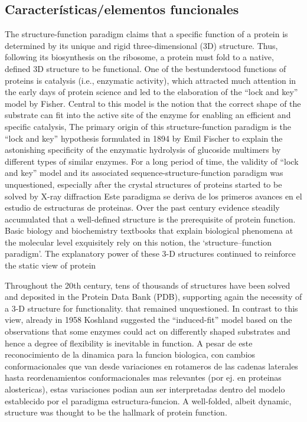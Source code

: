 \subsection{Características/elementos funcionales}
\label{functionalLandscape}


The structure-function paradigm claims that a specific function of a protein is determined by its unique and rigid three-dimensional (3D) structure. 
Thus, following its biosynthesis on the ribosome, a protein must fold to a native, defined 3D structure to be functional. 
One of the bestunderstood functions of proteins is catalysis (i.e., enzymatic activity), which attracted much attention in the early days of
protein science and led to the elaboration of the “lock and key” model by Fisher. 
Central to this model is the notion that the correct shape of the substrate can fit into the active site of the enzyme for enabling an efficient and specific catalysis,
The primary origin of this structure-function paradigm is the “lock and key” hypothesis formulated in 1894 by Emil Fischer to explain the astonishing specificity of the enzymatic hydrolysis of glucoside multimers by different types
of similar enzymes. For a long period of time, the validity of “lock and key” model and its associated sequence-structure-function paradigm was unquestioned, especially after the crystal structures of proteins started to be solved by X-ray diffraction
Este paradigma se deriva de los primeros avances en el estudio de estructuras de proteinas. Over the past century evidence steadily accumulated that a well-defined structure is the prerequisite of protein function.
Basic biology and biochemistry textbooks that explain biological phenomena at the molecular level exquisitely rely on this notion, the ‘structure–function paradigm’.
The explanatory power of these 3-D structures continued to reinforce the static view of protein

Throughout the 20th century, tens of thousands of structures have been solved and deposited in the Protein Data Bank (PDB), supporting again the necessity of a 3-D structure for functionality.
that remained unquestioned.
In contrast to this view, already in 1958 Koshland suggested the “induced-fit” model based on the observations that some enzymes could act on
differently shaped substrates and hence a degree of flexibility is inevitable in function. 
A pesar de este reconocimiento de la dinamica para la funcion biologica, con cambios conformacionales que van desde variaciones en rotameros de las cadenas laterales hasta reordenamientos conformacionales mas relevantes
(por ej. en proteinas alostericas), estas variaciones podian aun ser interpretadas dentro del modelo establecido por el paradigma estructura-funcion.
A well-folded, albeit dynamic, structure was thought to be the hallmark of protein function.

